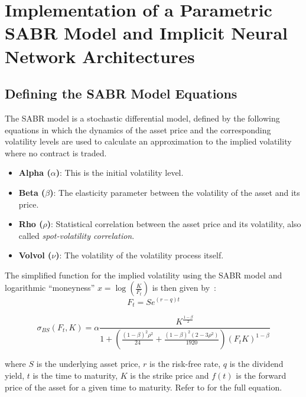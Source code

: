 \section{Implementation of a Parametric SABR Model and Implicit Neural Network Architectures}
\label{sec:implementation}

\subsection{Defining the SABR Model Equations}
\label{subsec:sabr}
The SABR model is a stochastic differential model, defined by the following equations in which the dynamics of the
asset price and the corresponding volatility levels are used to calculate an approximation to the implied volatility where no contract is traded.
\begin{itemize}
    \item \textbf{Alpha (\(\alpha\))}: This is the initial volatility level.
    \item \textbf{Beta (\(\beta\))}: The elasticity parameter between the volatility of the asset and its price.
    \item \textbf{Rho (\(\rho\))}: Statistical correlation between the asset price and its volatility, also called \textit{spot-volatility correlation}.
    \item \textbf{Volvol (\(\nu\))}: The volatility of the volatility process itself.
\end{itemize}

The simplified function for the implied volatility using the SABR model and logarithmic ``moneyness'' $x = \log\left(\frac{K}{F_t}\right)$ is then given by~\cite{Hagan2002}:
\begin{equation*}
    F_t = S e^{(r - q)t}
\end{equation*}

\begin{equation*}
    \sigma_{\textit{BS}}(F_t, K) =
    \alpha \frac{K^{\frac{1 - \beta}{2}}}{1 + \left( \frac{(1 - \beta)^2 \rho^2}{24} + \frac{(1 - \beta)^2(2 - 3\rho^2)}{1920} \right) (F_t K)^{1 - \beta}}
\end{equation*}

where $S$ is the underlying asset price, $r$ is the risk-free rate, $q$ is the dividend yield, $t$ is the time to maturity,
$K$ is the strike price and $f(t)$ is the forward price of the asset for a given time to maturity.
Refer to  for the full equation.

